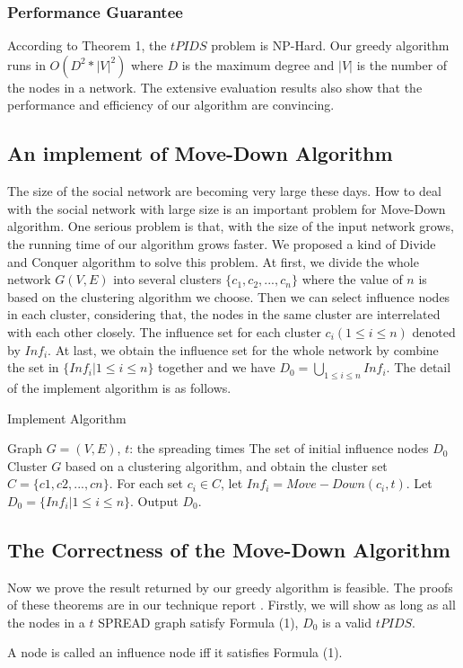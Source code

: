 \subsubsection*{Performance Guarantee}
According to Theorem 1, the $tPIDS$ problem is NP-Hard. Our greedy algorithm runs in $O(D^2*|V|^2)$ where $D$ is the maximum degree and $|V|$ is the number of the nodes in a network. The extensive evaluation results also show that the performance and efficiency of our algorithm are convincing.
\subsection{An implement of Move-Down Algorithm}
The size of the social network are becoming very large these days. How to deal with the social network with large size is an important problem for Move-Down algorithm. One serious problem is that, with the size of the input network grows, the running time of our algorithm grows faster. We proposed a kind of Divide and Conquer algorithm to solve this problem.  At first, we divide the whole network $G(V, E)$ into several clusters $\{c_1,c_2,...,c_n\}$ where the value of $n$ is based on the clustering algorithm we choose. Then we can select influence nodes in each cluster, considering that, the nodes in the same cluster are interrelated with each other closely. The influence set for each cluster $c_i(1\le i \le n)$ denoted by $Inf_{i}$.  At last, we obtain the influence set for the whole network by combine the set in $\{Inf_{i}|1\le i \le n\}$ together and we have $D_0= \bigcup_{1\le i \le n} Inf_{i}$. The detail of the implement algorithm is as follows.
\begin{algorithm}[!htb]
	\label{alg2}
	\caption{Implement Algorithm}
	\begin{algorithmic}[1] %
		\Require Graph $G=(V,E)$, $t$: the spreading times
		\Ensure The set of initial influence nodes $D_0$
		\State Cluster $G$ based on a clustering algorithm, and obtain the cluster set $C=\{c1,c2,...,cn\}$.
		\State For each set $c_i \in C$, let $Inf_i= Move-Down(c_i, t)$.
		\State Let $D_0=\{Inf_i | 1 \le i \le n\}$.
		\State Output $D_0$.
	\end{algorithmic}
\end{algorithm}
\vspace{-1cm}
\subsection{The Correctness of the Move-Down Algorithm}
Now we prove the result returned by our greedy algorithm is feasible. The proofs of these theorems are in our technique report\cite{ShiTech} .
Firstly, we will show as long as all the nodes in a $t$ SPREAD graph satisfy Formula (1), $D_0$ is a valid $tPIDS$.
\begin{theorem}
	A node is called an influence node iff it satisfies Formula (1).
\end{theorem}

